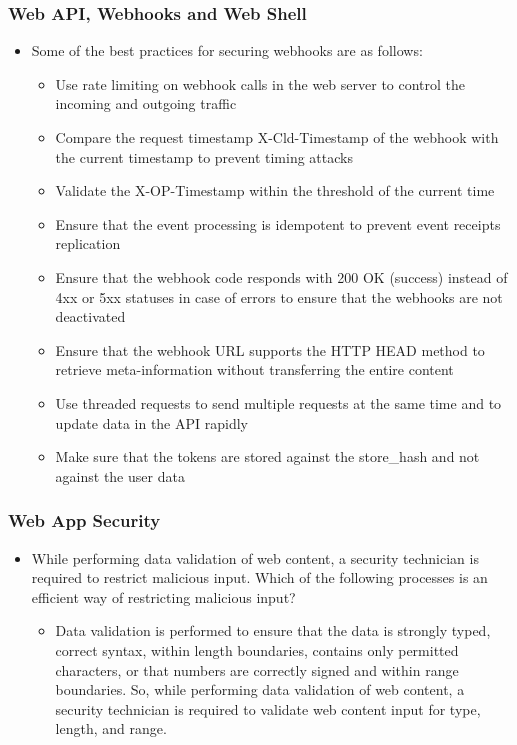\subsubsection{Web API, Webhooks and Web Shell}
\begin{itemize}
    \item Some of the best practices for securing webhooks are as follows:
    \begin{itemize}
        \item Use rate limiting on webhook calls in the web server to control the incoming and outgoing traffic
        \item Compare the request timestamp X-Cld-Timestamp of the webhook with the current timestamp to prevent timing attacks
        \item Validate the X-OP-Timestamp within the threshold of the current time
        \item Ensure that the event processing is idempotent to prevent event receipts replication
        \item Ensure that the webhook code responds with 200 OK (success) instead of 4xx or 5xx statuses in case of errors to ensure that the webhooks are not deactivated
        \item Ensure that the webhook URL supports the HTTP HEAD method to retrieve meta-information without transferring the entire content
        \item Use threaded requests to send multiple requests at the same time and to update data in the API rapidly
        \item Make sure that the tokens are stored against the store\_hash and not against the user data
    \end{itemize}
\end{itemize}
\subsubsection{Web App Security}
\begin{itemize}
    \item While performing data validation of web content, a security technician is required to restrict malicious input. Which of the following processes is an efficient way of restricting malicious input?
    \begin{itemize}
        \item Data validation is performed to ensure that the data is strongly typed, correct syntax, within length boundaries, contains only permitted characters, or that numbers are correctly signed and within range boundaries. So, while performing data validation of web content, a security technician is required to validate web content input for type, length, and range.
    \end{itemize}
\end{itemize}



